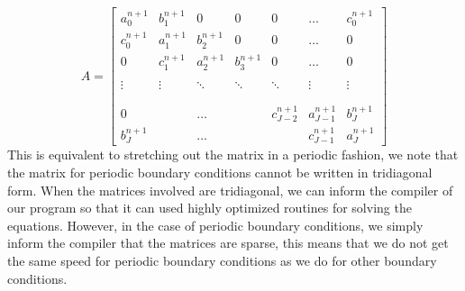 \begin{equation}
A =
\begin{bmatrix}
	a_0^{n+1} & b_1^{n+1} & 0                & 0                & 0        & \dots                                 & c_0^{n+1}        \\
	c_0^{n+1} & a_1^{n+1} & b_2^{n+1} & 0                & 0        & \dots                                 & 0        \\
	0                & c_1^{n+1} & a_2^{n+1} & b_3^{n+1}   & 0        & \dots                                 & 0        \\
			     &                   &                   &                  &           &                                         &           \\
	\vdots         & \vdots         & \ddots         & \ddots         & \ddots & \vdots                              & \vdots \\
			     &                   &                   &                  &           &                                         &           \\
			     &                   &                   &                  &           &                                         &           \\
	0                &                   & \dots           &                   &  c_{J-2}^{n+1} & a_{J-1}^{n+1}  & b_J^{n+1} \\
	b_J^{n+1}                &                   & \dots           &                   &                         &  c_{J-1}^{n+1} & a_J^{n+1}
\end{bmatrix}
\end{equation}
This is equivalent to stretching out the matrix in a periodic fashion, we note that the matrix for periodic boundary conditions cannot be written in tridiagonal form. When the matrices involved are tridiagonal, we can inform the compiler of our program so that it can used highly optimized routines for solving the equations. However, in the case of periodic boundary conditions, we simply inform the compiler that the matrices are sparse, this means that we do not get the same speed for periodic boundary conditions as we do for other boundary conditions.

